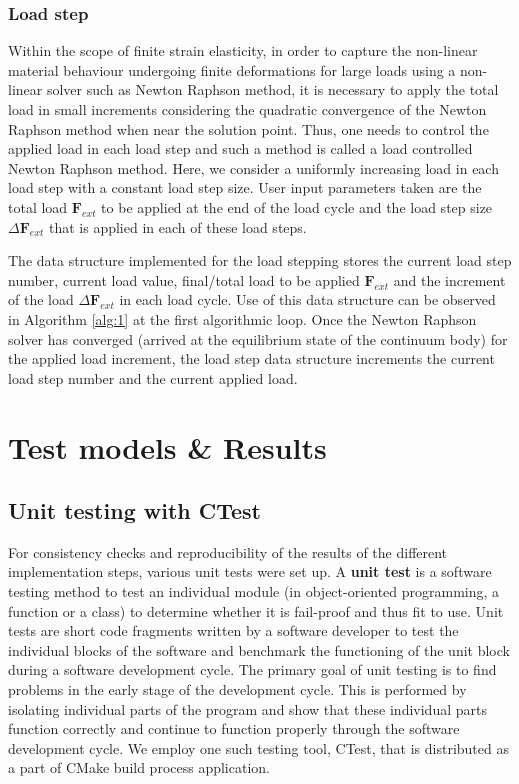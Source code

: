 \subsubsection{Load step}
Within the scope of finite strain elasticity, in order to capture the non-linear material behaviour undergoing finite deformations for large loads using a non-linear solver such as Newton Raphson method, it is necessary to apply the total load in small increments considering the quadratic convergence of the Newton Raphson method when near the solution point. Thus, one needs to control the applied load in each load step and such a method is called a load controlled Newton Raphson method. Here, we consider a uniformly increasing load in each load step with a constant load step size. User input parameters taken are the total load $\mathbf{F}_{ext}$ to be applied at the end of the load cycle and the load step size $\Delta \mathbf{F}_{ext}$ that is applied in each of these load steps. \par 
The data structure implemented for the load stepping stores the current load step number, current load value, final/total load to be applied $\mathbf{F}_{ext}$ and the increment of the load $\Delta \mathbf{F}_{ext}$ in each load cycle. Use of this data structure can be observed in Algorithm \eqref{alg:1} at the first algorithmic loop. Once the Newton Raphson solver has converged (arrived at the equilibrium state of the continuum body) for the applied load increment, the load step data structure increments the current load step number and the current applied load.
 
\section{Test models \& Results}

\subsection{Unit testing with CTest}
For consistency checks and reproducibility of the results of the different implementation steps, various unit tests were set up. A \textbf{unit test} is a software testing method to test an individual module (in object-oriented programming, a function or a class) to determine whether it is fail-proof and thus fit to use. Unit tests are short code fragments written by a software developer to test the individual blocks of the software and benchmark the functioning of the unit block during a software development cycle. The primary goal of unit testing is to find problems in the early stage of the development cycle. This is performed by isolating individual parts of the program and show that these individual parts function correctly and continue to function properly through the software development cycle. We employ one such testing tool, CTest, that is distributed as a part of CMake build process application. \par 

